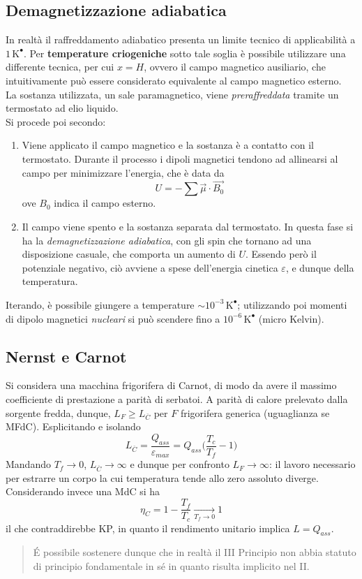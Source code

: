 \documentclass[10pt, oneside]{book}
\newcommand{\kelvin}[1]{\, \mathrm{K^{#1}}}
\newcommand{\tendsto}[2]{\xrightarrow[#1 \rightarrow #2]{}}
\begin{document}
\subsection{Demagnetizzazione adiabatica}
In realtà il raffreddamento adiabatico presenta un limite tecnico di applicabilità a $1 \kelvin{•}$. Per \textbf{temperature criogeniche} sotto tale soglia è possibile utilizzare una differente tecnica, per cui $x = H$, ovvero il campo magnetico ausiliario, che intuitivamente può essere considerato equivalente al campo magnetico esterno.\\
La sostanza utilizzata, un sale paramagnetico, viene \textit{preraffreddata} tramite un termostato ad elio liquido.\\
Si procede poi secondo:
\begin{enumerate}
\item Viene applicato il campo magnetico e la sostanza è a contatto con il termostato. Durante il processo i dipoli magnetici tendono ad allinearsi al campo per minimizzare l'energia, che è data da
\[U = - \sum \vec{\mu} \cdot \vec{B_0}\]
ove $B_0$ indica il campo esterno.
\item Il campo viene spento e la sostanza separata dal termostato. In questa fase si ha la \textit{demagnetizzazione adiabatica}, con gli spin che tornano ad una disposizione casuale, che comporta un aumento di $U$. Essendo però il potenziale negativo, ciò avviene a spese dell'energia cinetica $\varepsilon$, e dunque della temperatura.
\end{enumerate}
Iterando, è possibile giungere a temperature $\sim 10^{-3} \kelvin{•}$; utilizzando poi momenti di dipolo magnetici \textit{nucleari} si può scendere fino a $10^{-6} \kelvin{•}$ (micro Kelvin).

\subsection{Nernst e Carnot}
Si considera una macchina frigorifera di Carnot, di modo da avere il massimo coefficiente di prestazione a parità di serbatoi. A parità di calore prelevato dalla sorgente fredda, dunque, $L_F \geq L_{\overline{C}}$ per $F$ frigorifera generica (uguaglianza se MFdC). Esplicitando e isolando
\[L_{\overline{C}} = \frac{Q_{ass}}{\varepsilon_{max}} = Q_{ass} \bigg(\frac{T_c}{T_f} - 1\bigg)\]
Mandando $T_f \rightarrow 0$, $L_{\overline{C}} \rightarrow \infty $
e dunque per confronto $L_F \rightarrow \infty$: il lavoro necessario per estrarre un corpo la cui temperatura tende allo zero assoluto diverge.\\
Considerando invece una MdC si ha
\[\eta_C = 1 - \frac{T_f}{T_c} \tendsto{T_f}{0} 1\]
il che contraddirebbe KP, in quanto il rendimento unitario implica $L = Q_{ass}$. \\
\begin{quote}
\'E possibile sostenere dunque che in realtà il III Principio non abbia statuto di principio fondamentale in sé in quanto risulta implicito nel II.
\end{quote}
\end{document}
